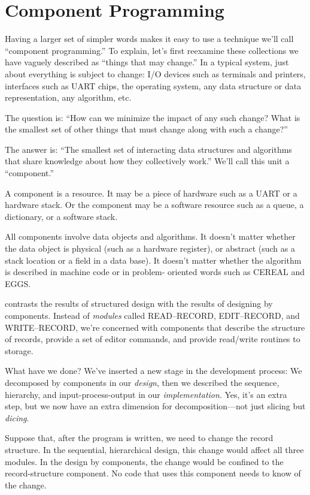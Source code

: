 \section{Component Programming}

Having a larger set of simpler words makes it easy to use a technique
we'll call ``component programming.'' To explain, let's first reexamine
these collections we have vaguely described as ``things that may change.''
In a typical system, just about everything is subject to change: I/O
devices such as terminals and printers, interfaces such as UART chips,
the operating system, any data structure or data representation, any
algorithm, etc.

The question is: ``How can we minimize the impact of any such change?
What is the smallest set of other things that must change along with
such a change?''

The answer is: ``The smallest set of interacting data structures and
algorithms that share knowledge about how they collectively work.''
We'll call this unit a ``component.''

A component is a resource. It may be a piece of hardware such as a
UART or a hardware stack. Or the component may be a software resource
such as a queue, a dictionary, or a software stack.

All components involve data objects and algorithms. It doesn't matter
whether the data object is physical (such as a hardware register),
or abstract (such as a stack location or a field in a data base).
It doesn't matter whether the algorithm is described in machine code
or in problem- oriented words such as CEREAL and EGGS.

 contrasts the results of structured design with the results
of designing by components. Instead of \emph{modules} called READ--RECORD,
EDIT--RECORD, and WRITE--RECORD, we're concerned with components
that describe the structure of records, provide a set of editor commands,
and provide read/write routines to storage.

What have we done? We've inserted a new stage in the development process:
We decomposed by components in our \emph{design}, then we described
the sequence, hierarchy, and input-process-output in our \emph{implementation}.
Yes, it's an extra step, but we now have an extra dimension for decomposition---not
just slicing but \emph{dicing}.

Suppose that, after the program is written, we need to change the
record structure. In the sequential, hierarchical design, this change
would affect all three modules. In the design by components, the change
would be confined to the record-structure component. No code that
uses this component needs to know of the change.

